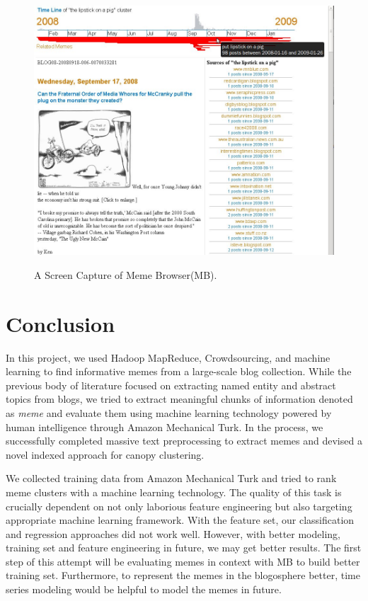 \documentclass{sig-alternate}
\begin{document}
\begin{figure}[p]
	\begin{center}
		{\includegraphics[width=\textwidth]{mockup.jpg}}
	\end{center}
	\caption{A Screen Capture of Meme Browser(MB).}
	\label{fig:mockup}
\end{figure}

\section{Conclusion}
In this project, we used Hadoop MapReduce, Crowdsourcing, and machine learning to find informative memes from a large-scale blog collection. While the previous body of literature focused on extracting named entity and abstract topics from blogs, we tried to extract meaningful chunks of information denoted as \emph{meme} and evaluate them using machine learning technology powered by human intelligence through Amazon Mechanical Turk. In the process, we successfully completed massive text preprocessing to extract memes and devised a novel indexed approach for canopy clustering. 

We collected training data from Amazon Mechanical Turk and tried to rank meme clusters with a machine learning technology. The quality of this task is crucially dependent on not only laborious feature engineering but also targeting appropriate machine learning framework. With the feature set, our classification and regression approaches did not work well. However, with better modeling, training set and feature engineering in future, we may get better results. The first step of this attempt will be evaluating memes in context with MB to build better training set. Furthermore, to represent the memes in the blogosphere better, time series modeling would be helpful to model the memes in future.

%

\end{document}
